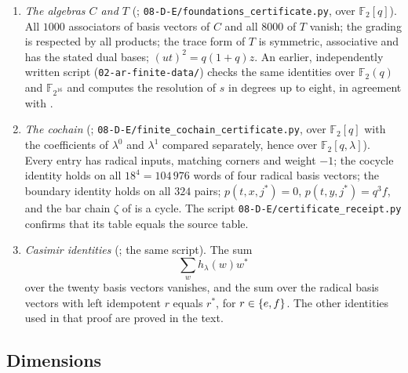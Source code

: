 \begin{enumerate}
  \item \emph{The algebras $C$ and $T$}
  (;
    \texttt{08-D-E/foundations\_}\allowbreak\texttt{certificate.py},
    over $\mathbb{F}_2[q]$). All
    $1000$ associators of basis vectors of $C$ and all $8000$ of $T$ vanish; the
    grading is respected by all products; the trace form of $T$ is symmetric,
    associative and has the stated dual bases; ${(ut)^2}={q(1+q)z}$. An earlier,
    independently written script (\texttt{02-ar-finite-data/}) checks the same
    identities over $\mathbb{F}_2(q)$ and $\mathbb{F}_{2^{16}}$ and computes the
    resolution of $s$ in degrees up to eight, in agreement with
    .
  \item \emph{The cochain} (;
    \texttt{08-D-E/finite\_cochain\_certificate.py}, over $\mathbb{F}_2[q]$ with
    the coefficients of $\lambda^0$ and $\lambda^1$ compared separately, hence
    over $\mathbb{F}_2[q,\lambda]$). Every entry has radical inputs, matching
    corners and weight ${-1}$; the cocycle identity holds on all ${18^4=104\,976}$
    words of four radical basis vectors; the boundary identity holds on all
    $324$ pairs; ${p(t,x,j^*)=0}$, ${p(t,y,j^*)=q^3f}$, and the bar chain $\zeta$
    of  is a cycle. The script
    \texttt{08-D-E/certificate\_receipt.py} confirms that its table equals the
    source table.
  \item \emph{Casimir identities} (; the same script). The sum
    \[
      \sum_wh_\lambda(w)w^*
    \]
    over the twenty basis vectors vanishes, and the sum
    over the radical basis vectors with left idempotent $r$ equals $r^*$, for
    ${r\in\set{e,f}}$. The other identities used in that proof are proved in the
    text.
\end{enumerate}

\subsection*{Dimensions}

